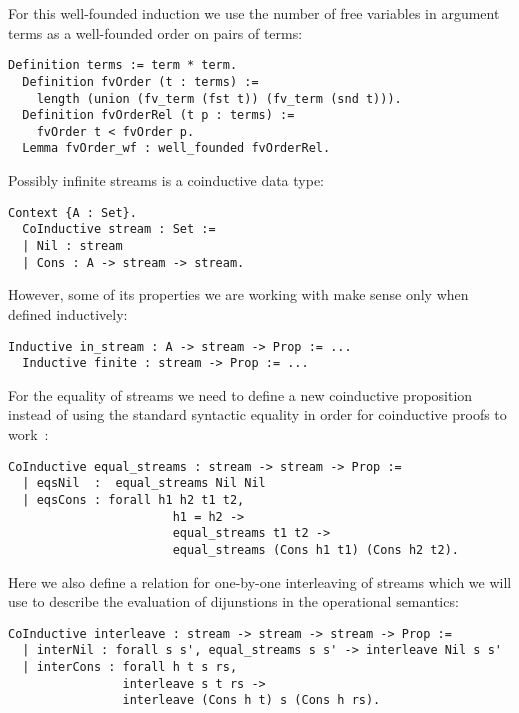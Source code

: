 For this well-founded induction we use the number of free variables in argument terms as a well-founded order on pairs of terms:

\begin{lstlisting}[language=Coq]
  Definition terms := term * term.
  Definition fvOrder (t : terms) :=
    length (union (fv_term (fst t)) (fv_term (snd t))).
  Definition fvOrderRel (t p : terms) :=
    fvOrder t < fvOrder p.
  Lemma fvOrder_wf : well_founded fvOrderRel.
\end{lstlisting}

Possibly infinite streams is a coinductive data type:

\begin{lstlisting}[language=Coq]
  Context {A : Set}.
  CoInductive stream : Set :=
  | Nil : stream
  | Cons : A -> stream -> stream.
\end{lstlisting}

However, some of its properties we are working with make sense only when defined inductively:

\begin{lstlisting}[language=Coq]
  Inductive in_stream : A -> stream -> Prop := ...
  Inductive finite : stream -> Prop := ...
\end{lstlisting}

For the equality of streams we need to define a new coinductive proposition instead of using the standard syntactic equality in order for coinductive proofs to work~\cite{CPDT}:

\begin{lstlisting}[language=Coq]
  CoInductive equal_streams : stream -> stream -> Prop :=
  | eqsNil  :  equal_streams Nil Nil
  | eqsCons : forall h1 h2 t1 t2,
                       h1 = h2 ->
                       equal_streams t1 t2 ->
                       equal_streams (Cons h1 t1) (Cons h2 t2).
\end{lstlisting}

Here we also define a relation for one-by-one interleaving of streams which we will use to describe the evaluation of dijunstions in the operational semantics:

\begin{lstlisting}[language=Coq]
  CoInductive interleave : stream -> stream -> stream -> Prop :=
  | interNil : forall s s', equal_streams s s' -> interleave Nil s s'
  | interCons : forall h t s rs,
                interleave s t rs ->
                interleave (Cons h t) s (Cons h rs).
\end{lstlisting}

